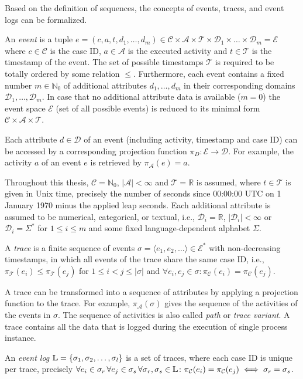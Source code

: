 Based on the definition of sequences, the concepts of events, traces, and event logs can be formalized.
\begin{definition}[Event]
An  \textit{event} is a tuple $e = (c,a,t,d_1,\dots, d_m) \in \mathcal{C} \times \mathcal{A}  \times \mathcal{T} \times \mathcal{D}_1 \times \dots \times \mathcal{D}_m =  \mathcal{E}$ where  $c \in \mathcal{C} $ is the case ID, $a \in \mathcal{A}$ is the executed activity and $t \in \mathcal{T}$ is the timestamp of the event.
The set of possible timestamps $\mathcal{T}$ is required to be totally ordered by some relation $\leq$.
Furthermore, each event contains a fixed number $m \in \mathbb{N}_0$ of additional attributes $d_1, \dots, d_m$ in their corresponding domains $\mathcal{D}_1, \dots , \mathcal{D}_m$.
In case that no additional attribute data is available ($m = 0$) the event space $\mathcal{E}$ (set of all possible events) is reduced to its minimal form $\mathcal{C} \times \mathcal{A}  \times \mathcal{T}$.
\end{definition}
Each attribute $d \in \mathcal{D}$ of an event (including activity, timestamp and case ID) can be accessed by a corresponding projection function $\pi_D \colon \mathcal{E} \to \mathcal{D}$.
For example, the activity $a$ of an event $e$ is retrieved by $\pi_\mathcal{A}(e) = a$.

Throughout this thesis,  $\mathcal{C} = \mathbb{N}_0$, $|\mathcal{A}| < \infty$ and $ \mathcal{T} = \mathbb{R}$ is assumed, where $t \in \mathcal{T}$ is given in Unix time, precisely the number of seconds since 00:00:00 UTC on 1 January 1970 minus the applied leap seconds.
Each additional attribute is assumed to be numerical, categorical, or textual, i.e., $\mathcal{D}_i = \mathbb{R}$, $|\mathcal{D}_i| < \infty$ or $\mathcal{D}_i = \Sigma^\ast$  for $1 \leq i \leq m$ and some fixed language-dependent alphabet $\Sigma$.
\begin{definition}[Trace]
	A \textit{trace} is a finite sequence of events $\sigma = \langle e_1, e_2, \dots\rangle \in  \mathcal{E}^\ast$ with non-decreasing timestamps, in which all events of the trace share the same case ID, i.e., $\pi_\mathcal{T} (e_i) \leq \pi_\mathcal{T} (e_j) $ for $1 \leq i < j \leq |\sigma|$ and $\forall e_i, e_j \in \sigma \colon \pi_\mathcal{C}(e_i) =  \pi_\mathcal{C}(e_j)$.
\end{definition}
A trace can be transformed into a sequence of attributes by applying a projection function to the trace.
For example, $\pi_\mathcal{A}(\sigma)$ gives the sequence of the activities of the events in $\sigma$.
The sequence of activities is also called \textit{path} or \textit{trace variant}.
A trace contains all the data that is logged during the execution of single process instance.
\begin{definition}
	An \textit{event log} $\mathbb{L} = \{ \sigma_1, \sigma _2, \dots, \sigma_l \}$ is a set of traces, where each case ID is unique per trace, precisely $\forall e_i \in \sigma_r \,  \forall e_j \in \sigma_s \, \forall  \sigma_r, \sigma_s \in \mathbb{L} \colon \pi_\mathcal{C}(e_i) = \pi_\mathcal{C}(e_j) \iff \sigma_r = \sigma_s$.
\end{definition}

